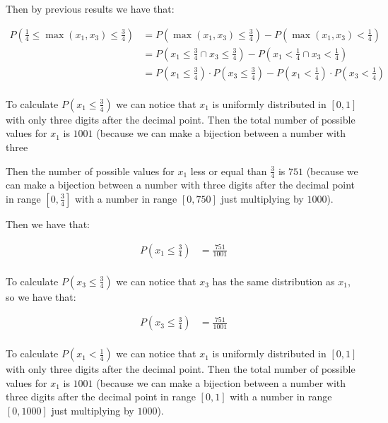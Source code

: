 Then by previous results we have that:

\begin{equation*}
    \begin{split}
        P(\frac{1}{4}\leq\max(x_1, x_3)\leq\frac{3}{4}) & = P(\max(x_1, x_3) \leq \frac{3}{4}) - P(\max(x_1, x_3) < \frac{1}{4})                                    \\
                                                        & = P(x_1 \leq \frac{3}{4} \cap x_3 \leq \frac{3}{4}) - P(x_1 < \frac{1}{4} \cap x_3 < \frac{1}{4})         \\
                                                        & = P(x_1 \leq \frac{3}{4}) \cdot P(x_3 \leq \frac{3}{4}) - P(x_1 < \frac{1}{4}) \cdot P(x_3 < \frac{1}{4}) \\
    \end{split}
\end{equation*}

To calculate $P(x_1 \leq \frac{3}{4})$ we can notice that $x_1$ is
uniformly distributed in $[0,1]$ with only three digits after the
decimal point. Then the total number of possible values for $x_1$ is
$1001$ (because we can make a bijection between a number with three

Then the number of possible values for $x_1$ less or equal than
$\frac{3}{4}$ is $751$ (because we can make a bijection between a number with three
digits after the decimal point in range $[0,\frac{3}{4}]$ with a
number in range $[0,750]$ just multiplying by $1000$).

Then we have that:

\begin{equation*}
    \begin{split}
        P(x_1 \leq \frac{3}{4}) & = \frac{751}{1001} \\
    \end{split}
\end{equation*}

To calculate $P(x_3 \leq \frac{3}{4})$ we can notice that $x_3$ has
the same distribution as $x_1$, so we have that:

\begin{equation*}
    \begin{split}
        P(x_3 \leq \frac{3}{4}) & = \frac{751}{1001} \\
    \end{split}
\end{equation*}

To calculate $P(x_1 < \frac{1}{4})$ we can notice that $x_1$ is
uniformly distributed in $[0,1]$ with only three digits after the
decimal point. Then the total number of possible values for $x_1$ is
$1001$ (because we can make a bijection between a number with three
digits after the decimal point in range $[0,1]$ with a number in
range $[0,1000]$ just multiplying by $1000$).

